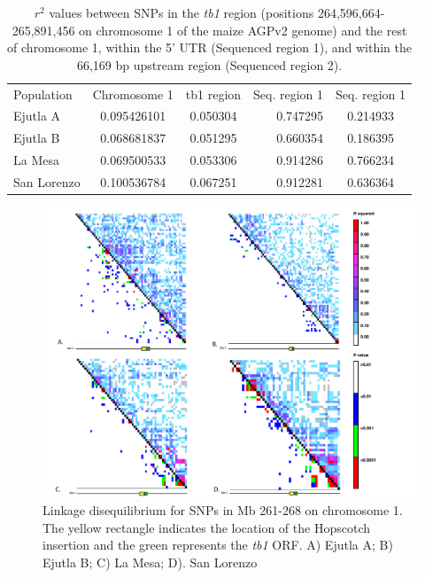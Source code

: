 \documentclass[12pt]{article}
\begin{document}
\begin{table}[htbp]
  \centering
  \caption{$r^{2}$ values between SNPs in the \emph{tb1} region (positions 264,596,664-265,891,456 on chromosome 1 of the maize AGPv2 genome) and the rest of chromosome 1, within the 5' UTR (Sequenced region 1), and within the 66,169 bp upstream region (Sequenced region 2).}
    \begin{tabular}{lccrc}
    \multirow{2}[2]{*}{Population} & \multirow{2}[2]{*}{Chromosome 1} & \multirow{2}[2]{*}{tb1 region} & \multicolumn{1}{c}{\multirow{2}[2]{*}{Seq. region 1}} & \multirow{2}[2]{*}{Seq. region 1 } \\
          &       &       & \multicolumn{1}{c}{} &  \\
    Ejutla A & 0.095426101 & 0.050304 & 0.747295 & 0.214933 \\
    Ejutla B & 0.068681837 & 0.051295 & 0.660354 & 0.186395 \\
    La Mesa & 0.069500533 & 0.053306 & 0.914286 & 0.766234 \\
    San Lorenzo & 0.100536784 & 0.067251 & 0.912281 & 0.636364 \\
    \bottomrule
    \end{tabular}
  \label{Table3R2}
\end{table}

\begin{figure}[!t]
  \begin{center}
   \includegraphics[width=150mm]{Fig2LDPlots.pdf}
    \caption{Linkage disequilibrium for SNPs in Mb 261-268 on chromosome 1. The yellow rectangle indicates the location of the Hopscotch insertion and the green represents the \emph{tb1} ORF. A) Ejutla A; B) Ejutla B; C) La Mesa; D). San Lorenzo} 
\label{Fig2LD}
  \end{center}
\end{figure}
\end{document}
